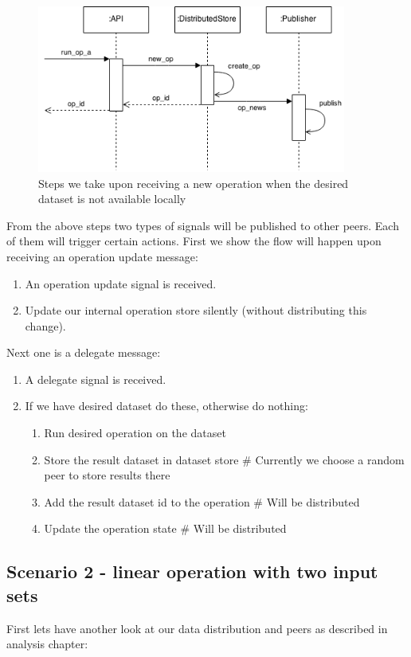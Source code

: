 \begin{figure}[h]
  \centering
  \includegraphics[width=4in]{poster/figures/kseq.png}
  \caption[Sequence diagram of receiving a new operation]
   {Steps we take upon receiving a new operation when the desired dataset is not available locally}
\end{figure}

From the above steps two types of signals will be published to other peers. 
Each of them will trigger certain actions. 
First we show the flow will happen upon receiving an operation update message:
\begin{enumerate}
\item An operation update signal is received.
\item Update our internal operation store silently (without distributing this change).
\end{enumerate}

Next one is a delegate message:
\begin{enumerate}
\item A delegate signal is received.
\item If we have desired dataset do these, otherwise do nothing:
  \begin{enumerate}
  \item Run desired operation on the dataset
  \item Store the result dataset in dataset store \# Currently we choose a random peer to store results there
  \item Add the result dataset id to the operation \# Will be distributed
  \item Update the operation state \# Will be distributed
  \end{enumerate}
\end{enumerate}

\subsection{Scenario 2 - linear operation with two input sets}
First lets have another look at our data distribution and peers as described in analysis chapter:

